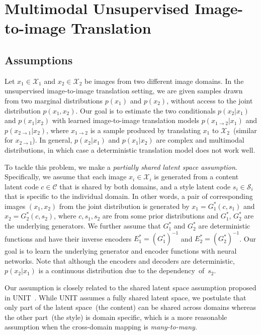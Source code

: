 \documentclass[runningheads]{llncs}
\begin{document}
	
	\section{Multimodal Unsupervised Image-to-image Translation}
	\label{sec:framework}
	


	
	\subsection{Assumptions}
	\label{sec:assumptions}
	
	Let $x_{1}\in\mathcal{X}_{1}$ and $x_{2}\in\mathcal{X}_{2}$ be images from two different image domains. In the unsupervised image-to-image translation setting, we are given samples drawn from two marginal distributions $p(x_{1})$ and $p(x_{2})$, without access to the joint distribution $p(x_{1},x_{2})$. Our goal is to estimate the two conditionals $p(x_{2}|x_{1})$ and $p(x_{1}|x_{2})$ with learned image-to-image translation models $p(x_{1\rightarrow 2}|x_{1})$ and $p(x_{2\rightarrow 1}|x_{2})$, where $x_{1\rightarrow 2}$ is a sample produced by translating $x_{1}$ to $\mathcal{X}_{2}$~(similar for $x_{2\rightarrow 1}$). In general, $p(x_{2}|x_{1})$ and $p(x_{1}|x_{2})$ are complex and multimodal distributions, in which case a deterministic translation model does not work well.
	
	To tackle this problem, we make a \textit{partially shared latent space assumption}. Specifically, we assume that each image $x_{i}\in\mathcal{X}_{i}$ is generated from a content latent code $c\in \mathcal{C}$ that is shared by both domains, and a style latent code $s_{i}\in \mathcal{S}_{i}$ that is specific to the individual domain. In other words, a pair of corresponding images $(x_{1},x_{2})$ from the joint distribution is generated by $x_{1} = G^{*}_{1}(c, s_{1})$ and $x_{2} = G^{*}_{2}(c, s_{2})$, where $c, s_{1}, s_{2}$ are from some prior distributions and $G^{*}_{1}$, $G^{*}_{2}$ are the underlying generators. We further assume that $G^{*}_{1}$ and $G^{*}_{2}$ are deterministic functions and have their inverse encoders $E^{*}_{1}=(G^{*}_{1})^{-1}$ and $E^{*}_{2}=(G^{*}_{2})^{-1}$. 
Our goal is to learn the underlying generator and encoder functions with neural networks. Note that although the encoders and decoders are deterministic, $p(x_{2}|x_{1})$ is a continuous distribution due to the \mbox{dependency of $s_{2}$}.
	
	
	Our assumption is closely related to the shared latent space assumption proposed in UNIT~\cite{liu2017unsupervised}. While UNIT assumes a fully shared latent space, we postulate that only part of the latent space~(the content) can be shared across domains whereas the other part~(the style) is domain specific, which is a more reasonable assumption when the cross-domain mapping is \emph{many-to-many}. 
\end{document}
